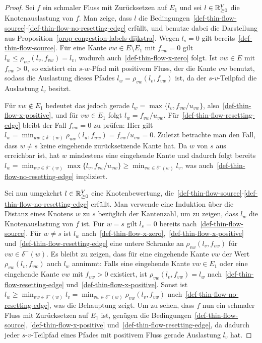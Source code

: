 \begin{proof}
	Sei $f$ ein schmaler Fluss mit Zurücksetzen auf $E_1$ und sei $l\in\mathbb{R}_{\geq 0}^V$ die Knotenauslastung von $f$.
	Man zeige, dass $l$ die Bedingungen~\ref{def-thin-flow-source}-\ref{def-thin-flow-no-resetting-edge} erfüllt, und benutze dabei die Darstellung aus Proposition~\ref{prop-congestion-labels-dijkstra}.
	Wegen $l_s = 0$ gilt bereits~\ref{def-thin-flow-source}.
	Für eine Kante $vw\in E\setminus E_1$ mit $f_{vw}=0$ gilt $l_w\leq \rho_{vw}(l_v, f_{vw}) = l_v$, wodurch auch~\ref{def-thin-flow-x-zero} folgt.
	Ist $vw\in E$ mit $f_{vw} > 0$, so existiert ein $s$-$w$-Pfad mit positivem Fluss, der die Kante $vw$ benutzt, sodass die Auslastung dieses Pfades $l_w=\rho_{vw}(l_v, f_{vw})$ ist, da der $s$-$v$-Teilpfad die Auslastung $l_v$ besitzt.
	
	Für $vw\notin E_1$ bedeutet das jedoch gerade $l_w = \max\{ l_v, f_{vw}/u_{vw} \}$, also~\ref{def-thin-flow-x-positive}, und für $vw\in E_1$ folgt $l_w = f_{vw} / u_{vw}$.
	Für~\ref{def-thin-flow-resetting-edge} bleibt der Fall $f_{vw} = 0$ zu prüfen:
	Hier gilt $l_w = \min_{uw\in\delta^-(w)} \rho_{uw}(l_u, f_{uw}) = f_{vw} / u_{vw} = 0$.
	Zuletzt betrachte man den Fall, dass $w\neq s$ keine eingehende zurücksetzende Kante hat.
	Da $w$ von $s$ aus erreichbar ist, hat $w$ mindestens eine eingehende Kante und dadurch folgt bereits $l_w = \min_{vw\in \delta^-(w)} \max\{ l_v, f_{vw} / u_{vw} \} \geq \min_{vw\in\delta^-(w)} l_v$, was auch~\ref{def-thin-flow-no-resetting-edge} impliziert.
	
	Sei nun umgekehrt $l\in\mathbb{R}_{\geq 0}^V$ eine Knotenbewertung, die~\ref{def-thin-flow-source}-\ref{def-thin-flow-no-resetting-edge} erfüllt.
	Man verwende eine Induktion über die Distanz eines Knotens $w$ zu $s$ bezüglich der Kantenzahl, um zu zeigen, dass $l_w$ die Knotenauslastung von $f$ ist.
	Für $w=s$ gilt $l_s=0$ bereits nach~\ref{def-thin-flow-source}.
	Für $w\neq s$ ist $l_w$ nach~\ref{def-thin-flow-x-zero},~\ref{def-thin-flow-x-positive} und~\ref{def-thin-flow-resetting-edge} eine untere Schranke an $\rho_{vw}(l_v, f_{vw})$ für $vw\in\delta^-(w)$.
	Es bleibt zu zeigen, dass für eine eingehende Kante $vw$ der Wert $\rho_{vw}(l_v, f_{vw})$ auch $l_w$ annimmt:
	Falls eine eingehende Kante $vw\in E_1$ oder eine eingehende Kante $vw$ mit $f_{vw} > 0$ existiert, ist $\rho_{vw}(l_v, f_{vw}) = l_w$ nach~\ref{def-thin-flow-resetting-edge} und~\ref{def-thin-flow-x-positive}.
	Sonst ist $l_w\geq \min_{vw\in \delta^-(w)} l_v = \min_{vw\in \delta^-(w)} \rho_{vw}(l_v, f_{vw})$ nach~\ref{def-thin-flow-no-resetting-edge}, was die Behauptung zeigt.
	Um zu sehen, dass $f$ nun ein schmaler Fluss mit Zurücksetzen auf $E_1$ ist, genügen die Bedingungen~\ref{def-thin-flow-source}, \ref{def-thin-flow-x-positive} und~\ref{def-thin-flow-resetting-edge}, da dadurch jeder $s$-$v$-Teilpfad eines Pfades mit positivem Fluss gerade Auslastung $l_v$ hat.
\end{proof}

